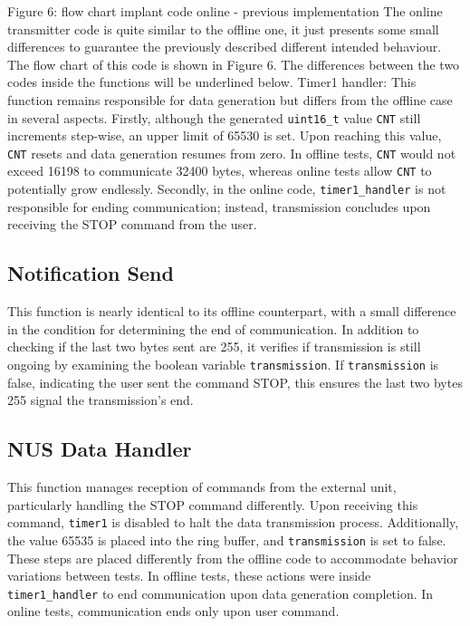 \documentclass{Configuration_Files/PoliMi3i_thesis}
\begin{document}
Figure 6: flow chart implant code online - previous implementation
The online transmitter code is quite similar to the offline one, it just presents some small differences to guarantee the previously described different intended behaviour. The flow chart of this code is shown in Figure 6. The differences between the two codes inside the functions will be underlined below. 
Timer1 handler: This function remains responsible for data generation but differs from the offline case in several aspects. Firstly, although the generated \texttt{uint16\_t} value \texttt{CNT} still increments step-wise, an upper limit of 65530 is set. Upon reaching this value, \texttt{CNT} resets and data generation resumes from zero. In offline tests, \texttt{CNT} would not exceed 16198 to communicate 32400 bytes, whereas online tests allow \texttt{CNT} to potentially grow endlessly. Secondly, in the online code, \texttt{timer1\_handler} is not responsible for ending communication; instead, transmission concludes upon receiving the STOP command from the user.

\subsection*{Notification Send}
This function is nearly identical to its offline counterpart, with a small difference in the condition for determining the end of communication. In addition to checking if the last two bytes sent are 255, it verifies if transmission is still ongoing by examining the boolean variable \texttt{transmission}. If \texttt{transmission} is false, indicating the user sent the command STOP, this ensures the last two bytes 255 signal the transmission's end.

\subsection*{NUS Data Handler}
This function manages reception of commands from the external unit, particularly handling the STOP command differently. Upon receiving this command, \texttt{timer1} is disabled to halt the data transmission process. Additionally, the value 65535 is placed into the ring buffer, and \texttt{transmission} is set to false. These steps are placed differently from the offline code to accommodate behavior variations between tests. In offline tests, these actions were inside \texttt{timer1\_handler} to end communication upon data generation completion. In online tests, communication ends only upon user command.
\end{document}
